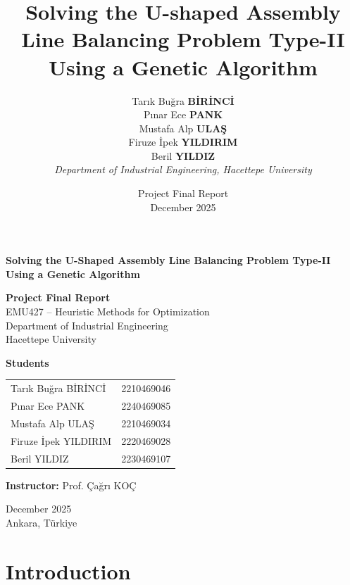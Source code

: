 \documentclass[12pt,a4paper]{article}
\title{\noindent\textbf{Solving the U-shaped Assembly Line Balancing Problem Type-II\\Using a Genetic Algorithm}}
\author{
Tarık Buğra \textbf{BİRİNCİ} \quad 2210469046 \\
Pınar Ece \textbf{PANK} \quad 2240469085 \\
Mustafa Alp \textbf{ULAŞ} \quad 2210469034 \\
Firuze İpek \textbf{YILDIRIM} \quad 2220469028 \\
Beril \textbf{YILDIZ} \quad 2230469107 \\[6pt]
\textit{Department of Industrial Engineering, Hacettepe University}
}
\date{Project Final Report\\December 2025}
\begin{document}


\begin{titlepage}
    \centering
    \vspace*{2cm}

    {\LARGE \noindent\textbf{Solving the U-Shaped Assembly Line Balancing Problem Type-II \\[2mm]
    Using a Genetic Algorithm}} \par

    \vspace{1.4cm}

    {\large \noindent\textbf{Project Final Report}} \\[0.4cm]
    {\large EMU427 -- Heuristic Methods for Optimization} \\[0.3cm]
    {\large Department of Industrial Engineering \\ Hacettepe University}

    \vspace{2cm}

    {\large \noindent\textbf{Students}} \\[0.5cm]

    \begin{center}
        \begin{tabular}{l r}
            Tarık Buğra BİRİNCİ & 2210469046 \\
            Pınar Ece PANK & 2240469085 \\
            Mustafa Alp ULAŞ & 2210469034 \\
            Firuze İpek YILDIRIM & 2220469028 \\
            Beril YILDIZ & 2230469107 \\[6pt]
        \end{tabular}
    \end{center}

    \vspace{1.6cm}

    {\large \noindent\textbf{Instructor:} Prof. Çağrı KOÇ}

    \vfill
    {\large December 2025 \\ Ankara, Türkiye}
\end{titlepage}

\tableofcontents
\newpage



\newpage
\section{Introduction}
\end{document}
